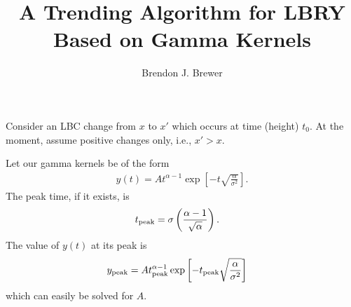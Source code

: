\documentclass[a4paper, 12pt]{article}
\title{A Trending Algorithm for LBRY Based on Gamma Kernels}
\author{Brendon J. Brewer}
\date{}
\begin{document}
\maketitle


\setlength{\parindent}{0pt}
\setlength{\parskip}{8pt}

Consider an LBC change from $x$ to $x'$ which occurs at time (height) $t_0$.
At the moment, assume positive changes only, i.e., $x' > x$.


Let our gamma kernels be
of the form
\begin{align}
y(t) = A t^{\alpha - 1}
        \exp\left[-t\sqrt{\frac{\alpha}{\sigma^2}}\right].
\end{align}
The peak time, if it exists, is
\begin{align}
t_{\rm peak} &= \sigma\left(\frac{\alpha-1}{\sqrt{\alpha}}\right).
\end{align}
The value of $y(t)$ at its peak is
\begin{align}
y_{\rm peak} &= A t_{\rm peak}^{\alpha - 1}
        \exp\left[-t_{\rm peak}\sqrt{\frac{\alpha}{\sigma^2}}\right]
\end{align}
which can easily be solved for $A$.
\end{document}

